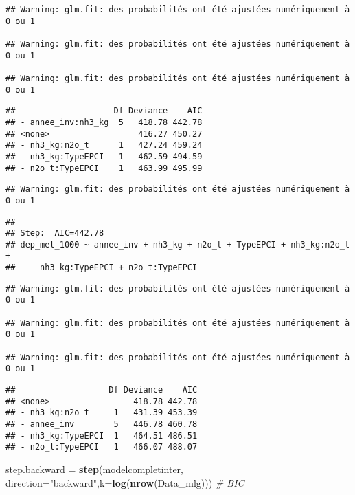 \documentclass[
]{article}
\newenvironment{Shaded}{\begin{snugshade}}{\end{snugshade}}
\newcommand{\AttributeTok}[1]{\textcolor[rgb]{0.13,0.29,0.53}{#1}}
\newcommand{\CommentTok}[1]{\textcolor[rgb]{0.56,0.35,0.01}{\textit{#1}}}
\newcommand{\FunctionTok}[1]{\textcolor[rgb]{0.13,0.29,0.53}{\textbf{#1}}}
\newcommand{\NormalTok}[1]{#1}
\newcommand{\OtherTok}[1]{\textcolor[rgb]{0.56,0.35,0.01}{#1}}
\newcommand{\StringTok}[1]{\textcolor[rgb]{0.31,0.60,0.02}{#1}}
\begin{document}
\begin{verbatim}
## Warning: glm.fit: des probabilités ont été ajustées numériquement à 0 ou 1

## Warning: glm.fit: des probabilités ont été ajustées numériquement à 0 ou 1

## Warning: glm.fit: des probabilités ont été ajustées numériquement à 0 ou 1
\end{verbatim}

\begin{verbatim}
##                    Df Deviance    AIC
## - annee_inv:nh3_kg  5   418.78 442.78
## <none>                  416.27 450.27
## - nh3_kg:n2o_t      1   427.24 459.24
## - nh3_kg:TypeEPCI   1   462.59 494.59
## - n2o_t:TypeEPCI    1   463.99 495.99
\end{verbatim}

\begin{verbatim}
## Warning: glm.fit: des probabilités ont été ajustées numériquement à 0 ou 1
\end{verbatim}

\begin{verbatim}
## 
## Step:  AIC=442.78
## dep_met_1000 ~ annee_inv + nh3_kg + n2o_t + TypeEPCI + nh3_kg:n2o_t + 
##     nh3_kg:TypeEPCI + n2o_t:TypeEPCI
\end{verbatim}

\begin{verbatim}
## Warning: glm.fit: des probabilités ont été ajustées numériquement à 0 ou 1

## Warning: glm.fit: des probabilités ont été ajustées numériquement à 0 ou 1

## Warning: glm.fit: des probabilités ont été ajustées numériquement à 0 ou 1
\end{verbatim}

\begin{verbatim}
##                   Df Deviance    AIC
## <none>                 418.78 442.78
## - nh3_kg:n2o_t     1   431.39 453.39
## - annee_inv        5   446.78 460.78
## - nh3_kg:TypeEPCI  1   464.51 486.51
## - n2o_t:TypeEPCI   1   466.07 488.07
\end{verbatim}

\begin{Shaded}
\begin{Highlighting}[]
\NormalTok{step.backward }\OtherTok{=} \FunctionTok{step}\NormalTok{(modelcompletinter, }\AttributeTok{direction=}\StringTok{"backward"}\NormalTok{,}\AttributeTok{k=}\FunctionTok{log}\NormalTok{(}\FunctionTok{nrow}\NormalTok{(Data\_mlg))) }\CommentTok{\# BIC}
\end{Highlighting}
\end{Shaded}
\end{document}
